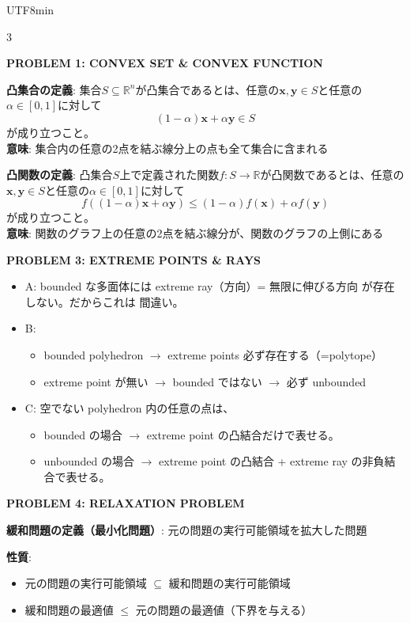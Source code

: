\documentclass[8pt,a4paper]{article}
\newcommand{\mysection}[1]{\vspace{2pt}\textbf{#1}\vspace{1pt}}
\begin{document}
\begin{CJK}{UTF8}{min}

\begin{multicols}{3}

\mysection{PROBLEM 1: CONVEX SET \& CONVEX FUNCTION}

\textbf{凸集合の定義}: 集合$S \subseteq \mathbb{R}^n$が凸集合であるとは、任意の$\boldsymbol{x}, \boldsymbol{y} \in S$と任意の$\alpha \in [0,1]$に対して
\[
(1-\alpha)\boldsymbol{x} + \alpha\boldsymbol{y} \in S
\]
が成り立つこと。\\
\textbf{意味}: 集合内の任意の2点を結ぶ線分上の点も全て集合に含まれる

\textbf{凸関数の定義}: 凸集合$S$上で定義された関数$f: S \to \mathbb{R}$が凸関数であるとは、任意の$\boldsymbol{x}, \boldsymbol{y} \in S$と任意の$\alpha \in [0,1]$に対して
\[
f((1-\alpha)\boldsymbol{x} + \alpha\boldsymbol{y}) \leq (1-\alpha)f(\boldsymbol{x}) + \alpha f(\boldsymbol{y})
\]
が成り立つこと。\\
\textbf{意味}: 関数のグラフ上の任意の2点を結ぶ線分が、関数のグラフの上側にある

\mysection{PROBLEM 3: EXTREME POINTS \& RAYS}
\begin{itemize}
    \item A: bounded な多面体には extreme ray（方向）= 無限に伸びる方向 が存在しない。だからこれは 間違い。
    \item B: 
    \begin{itemize}
        \item bounded polyhedron $\to$ extreme points 必ず存在する（=polytope）
        \item extreme point が無い $\to$ bounded ではない $\to$ 必ず unbounded
    \end{itemize}
    \item C: 空でない polyhedron 内の任意の点は、
    \begin{itemize}
        \item bounded の場合 $\to$ extreme point の凸結合だけで表せる。
        \item unbounded の場合 $\to$ extreme point の凸結合 + extreme ray の非負結合で表せる。
    \end{itemize}
\end{itemize}

\mysection{PROBLEM 4: RELAXATION PROBLEM}

\textbf{緩和問題の定義（最小化問題）}: 元の問題の実行可能領域を拡大した問題

\textbf{性質}:
\begin{itemize}
    \item 元の問題の実行可能領域 $\subseteq$ 緩和問題の実行可能領域
    \item 緩和問題の最適値 $\leq$ 元の問題の最適値（下界を与える）
\end{itemize}


\end{multicols}
\end{CJK}
\end{document}
